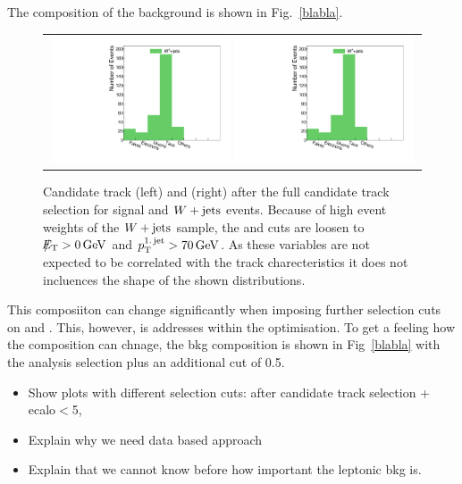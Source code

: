 The composition of the background is shown in Fig.~\ref{blabla}.
\begin{figure}[!tb]
  \centering 
  \begin{tabular}{c}
    \includegraphics[width=0.49\textwidth]{figures/analysis/htrackgenParticleSmallRange_lin.pdf}
    \includegraphics[width=0.49\textwidth]{figures/analysis/htrackgenParticleSmallRange_lin.pdf}
  \end{tabular}
  \caption{Candidate track \pt (left) and \ias (right) after the full candidate track selection for signal and $W+\text{jets}$ events. 
           Because of high event weights of the $W+\text{jets}$ sample, the \met and \ptfirstjet cuts are loosen to $\slash\mkern-12mu{E}_{\text{T}}>0\,\text{Ge}\kern-0.06667em\text{V}$ and $p_{\text{T}}^{\text{1.\,jet}}>70\,\text{Ge}\kern-0.06667em\text{V}$. 
           As these variables are not expected to be correlated with the track charecteristics it does not incluences the shape of the shown distributions.}
  \label{fig:PtAndIasAfterFullPreselection}
\end{figure}
This composiiton can change significantly when imposing further selection cuts on \pt and \ias.
This, however, is addresses within the optimisation.
To get a feeling how the composition can chnage, the bkg composition is shown in Fig~\ref{blabla} with the analysis selection plus an additional \ias cut of 0.5.


\begin{itemize}
\item Show plots with different selection cuts: after candidate track selection + ecalo$<$5\gev, 
\item Explain why we need data based approach
\item Explain that we cannot know before how important the leptonic bkg is.
\end{itemize}

